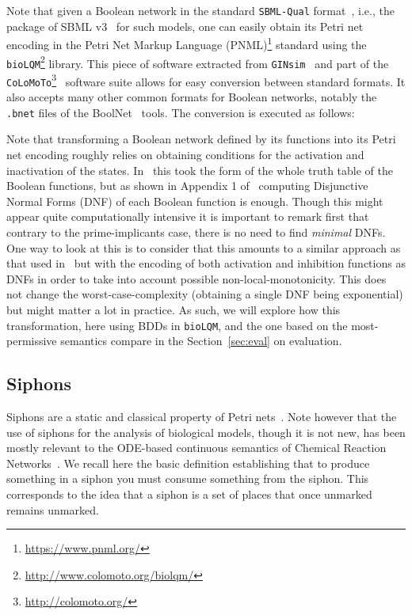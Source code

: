 \documentclass[preprint,12pt]{elsarticle}
\begin{document}
Note that given a Boolean network in the standard \texttt{SBML-Qual} format~\cite{chaouiya2013sbml}, i.e., the package of SBML v3~\cite{keating2020sbml} for such models, one can easily obtain its Petri net encoding in the Petri Net Markup Language  (PNML)\footnote{\url{https://www.pnml.org/}} standard using the \texttt{bioLQM}\footnote{\url{http://www.colomoto.org/biolqm/}} library.
This piece of software extracted from \texttt{GINsim}~\cite{chaouiya2012logical} and part of the \texttt{CoLoMoTo}\footnote{\url{http://colomoto.org/}}~\cite{naldi2015cooperative} software suite allows for easy conversion between standard formats.
It also accepts many other common formats for Boolean networks, notably the \verb|.bnet| files of the  BoolNet~\cite{mussel2010boolnet,klarner2017pyboolnet} tools.
The conversion is executed as follows:


Note that transforming a Boolean network defined by its functions into its Petri net encoding roughly relies on obtaining conditions for the activation and inactivation of the states. In~\cite{chaouiya2004qualitative} this took the form of the whole truth table of the Boolean functions, but as shown in Appendix 1 of~\cite{chatain2014characterization} computing Disjunctive Normal Forms (DNF) of each Boolean function is enough.
Though this might appear quite computationally intensive it is important to remark first that contrary to the prime-implicants case, there is no need to find \emph{minimal} DNFs.
One way to look at this is to consider that this amounts to a similar approach as that used in~\cite{DBLP:conf/ictai/ChevalierFPZ19} but with the encoding of both activation and inhibition functions as DNFs in order to take into account possible non-local-monotonicity.
This does not change the worst-case-complexity (obtaining a single DNF being exponential) but might matter a lot in practice.
As such, we will explore how this transformation, here using BDDs in \texttt{bioLQM}, and the one based on the most-permissive semantics compare in the Section~\ref{sec:eval} on evaluation.

\subsection{Siphons}

Siphons are a static and classical property of Petri nets~\cite{peterson1981petri}.
Note however that the use of siphons for the analysis of biological models, though it is not new, has been mostly relevant to the ODE-based continuous semantics of Chemical Reaction Networks~\cite{angeli2007petri,angeli2011persistence,degrand2020graphical}.
We recall here the basic definition establishing that to produce something in a siphon you must consume something from the siphon.
This corresponds to the idea that a siphon is a set of places that once unmarked remains unmarked.
\end{document}

